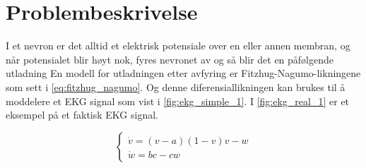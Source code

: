 \clearpage
\section{Problembeskrivelse}
\label{problemBeskrivelse}


I et nevron er det alltid et elektrisk potensiale over en eller annen membran, og når potensialet blir høyt nok, fyres nevronet av og så blir det en påfølgende utladning En modell for utladningen etter avfyring er Fitzhug-Nagumo-likningene som sett i \autoref{eq:fitzhug_nagumo}. Og denne diferensiallikningen kan brukes til å moddelere et EKG signal som vist i \autoref{fig:ekg_simple_1}. I \autoref{fig:ekg_real_1} er et eksempel på et faktisk EKG signal.

\begin{equation}
    \label{eq:fitzhug_nagumo}
    \begin{cases}
        \dot{v} = (v-a)(1-v)v-w \\
        \dot{w} = bc - cw
    \end{cases}
\end{equation}

